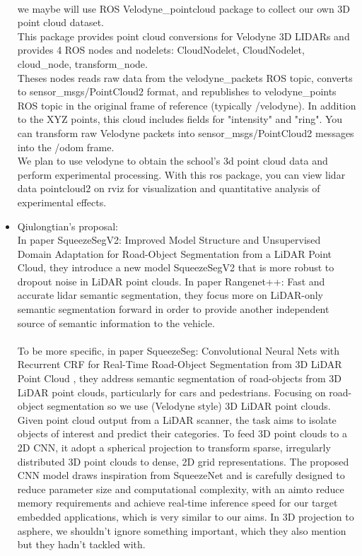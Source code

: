 \documentclass{article}
\begin{document}
\begin{normalsize}
\begin{itemize}
\\
we maybe will use ROS Velodyne\_pointcloud package to collect our own 3D point cloud dataset.\\
This package provides point cloud conversions for Velodyne 3D LIDARs and provides 4 ROS nodes and nodelets: CloudNodelet, CloudNodelet, cloud\_node, transform\_node. \\
Theses nodes reads raw data from the velodyne\_packets ROS topic, converts to sensor\_msgs/PointCloud2 format, and republishes to velodyne\_points ROS topic in the original frame of reference (typically /velodyne). In addition to the XYZ points, this cloud includes fields for "intensity" and "ring".
You can transform raw Velodyne packets into sensor\_msgs/PointCloud2 messages into the /odom frame.\\
We plan to use velodyne to obtain the school’s 3d point cloud data and perform experimental processing. With this ros package, you can view lidar data pointcloud2 on rviz for visualization and quantitative analysis of experimental effects.\\
\item Qiulongtian's proposal:\\
In paper SqueezeSegV2: Improved Model Structure and Unsupervised Domain 
Adaptation for Road-Object Segmentation from a LiDAR Point Cloud, they introduce a new model SqueezeSegV2 that is more robust to dropout noise in LiDAR point clouds. In paper Rangenet++: Fast and accurate lidar semantic segmentation, they focus  more on LiDAR-only semantic segmentation forward in order to provide another independent source of semantic information to the vehicle. 
\\\\
To be more specific, in paper SqueezeSeg: Convolutional Neural Nets with Recurrent CRF for Real-Time Road-Object Segmentation from 3D LiDAR Point Cloud , they address  semantic segmentation of road-objects from 3D LiDAR point clouds, particularly for cars and pedestrians. Focusing on road-object segmentation so we use (Velodyne style) 3D LiDAR point clouds. Given point cloud output from a LiDAR scanner, the task aims to isolate objects of interest and predict their categories. To feed 3D point clouds to a 2D CNN, it adopt a spherical projection to 
transform sparse, irregularly distributed 3D point clouds to dense, 2D grid representations. The proposed CNN model draws inspiration from SqueezeNet  and is carefully designed to reduce parameter size and computational complexity, with an aimto reduce memory requirements and achieve real-time inference speed for our target embedded applications, which is very similar to our aims. In 3D projection to asphere, we shouldn’t ignore something important, which they also mention but they hadn’t tackled with.

\end{itemize}
\end{normalsize}
\end{document}
